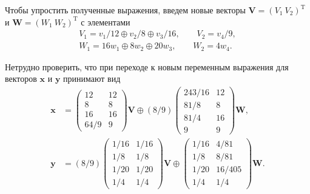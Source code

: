 \documentclass[specialist,
               substylefile = spbu.rtx,
               subf,href,colorlinks=true, 12pt]{disser}
\DeclareMathOperator{\T}{T}
\theoremstyle{definition}
\begin{document}
Чтобы упростить полученные выражения, введем новые векторы $\bm{V}=(V_{1}~V_{2})^{\T}$ и $\bm{W}=(W_{1}~W_{2})^{\T}$ с элементами
\begin{gather*}
V_{1}
=
v_{1}/12\oplus v_{2}/8\oplus v_{3}/16,
\qquad
V_{2}
=
v_{4}/9,
\\
W_{1}
=
16w_{1}\oplus 8w_{2}\oplus 20w_{3},
\qquad
W_{2}
=
4w_{4}.
\end{gather*}

Нетрудно проверить, что при переходе к новым переменным выражения для векторов $\bm{x}$ и $\bm{y}$ принимают вид
\begin{align*}
\bm{x}
&=
\left(
\begin{array}{cc}
12 & 12
\\
8 & 8
\\
16 & 16
\\
64/9 & 9
\end{array}
\right)
\bm{V}
\oplus
(8/9)
\left(
\begin{array}{cc}
243/16 & 12
\\
81/8 & 8
\\
81/4 & 16
\\
9 & 9
\end{array}
\right)
\bm{W},
\\
\bm{y}
&=
(8/9)
\left(
\begin{array}{cc}
1/16 & 1/16
\\
1/8 & 1/8
\\
1/20 & 1/20
\\
1/4 & 1/4
\end{array}
\right)
\bm{V}
\oplus
\left(
\begin{array}{cc}
1/16 & 4/81
\\
1/8 & 8/81
\\
1/20 & 16/405
\\
1/4 & 1/4
\end{array}
\right)
\bm{W}.
\end{align*}
\end{document}
